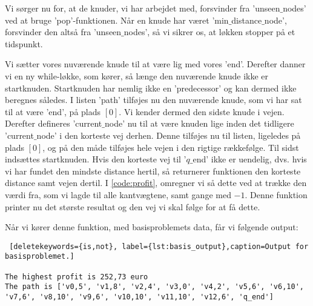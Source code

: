 Vi sørger nu for, at de knuder, vi har arbejdet med, forsvinder fra 'unseen$\_$nodes' ved at bruge 'pop'-funktionen. Når en knude har været 'min$\_$distance$\_$node', forsvinder den altså fra 'unseen$\_$nodes', så vi sikrer os, at løkken stopper på et tidspunkt. 

Vi sætter vores nuværende knude til at være lig med vores 'end'.
Derefter danner vi en ny while-løkke, som kører, så længe den nuværende knude ikke er startknuden. Startknuden har nemlig ikke en 'predecessor' og kan dermed ikke beregnes således. I listen 'path' tilføjes nu den nuværende knude, som vi har sat til at være 'end', på plads $[0]$. Vi kender dermed den sidste knude i vejen. Derefter defineres 'current$\_$node' nu til at være knuden lige inden det tidligere 'current$\_$node' i den korteste vej derhen. Denne tilføjes nu til listen, ligeledes på plads $[0]$, og på den måde tilføjes hele vejen i den rigtige rækkefølge. Til sidst indsættes startknuden.
Hvis den korteste vej til '$q\_$end' ikke er uendelig, dvs. hvis vi har fundet den mindste distance hertil, så returnerer funktionen den korteste distance samt vejen dertil.
I \autoref{code:profit}, omregner vi så dette ved at trække den værdi fra, som vi lagde til alle kantvægtene, samt gange med $-1$. Denne funktion printer nu det største resultat og den vej vi skal følge for at få dette. 

 

Når vi kører denne funktion, med basisproblemets data, får vi følgende output:

\begin{lstlisting} [deletekeywords={is,not}, label={lst:basis_output},caption=Output for basisproblemet.]

The highest profit is 252,73 euro
The path is ['v0,5', 'v1,8', 'v2,4', 'v3,0', 'v4,2', 'v5,6', 'v6,10', 'v7,6', 'v8,10', 'v9,6', 'v10,10', 'v11,10', 'v12,6', 'q_end']

\end{lstlisting}
